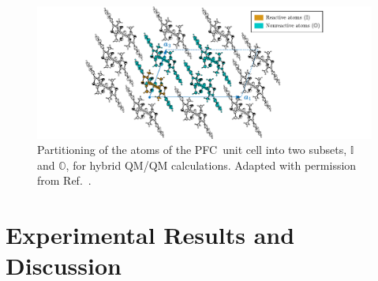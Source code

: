 \begin{figure}[ht!]
  \centering
  \includegraphics[width = \textwidth]{Figures/fig_DAE_PFC_QMQMmodel.pdf}
  \caption[Partitioning of PFC unit for QM/QM~calculations.]{
    Partitioning of the atoms of the PFC~unit cell into two subsets, $\mathbb{I}$ and $\mathbb{O}$,
    for hybrid QM/QM calculations.
    Adapted with permission from Ref.~\cite{Irie2001, Jean-Ruel2013}.
  }
  \label{fig: DAE-PFC-QMQMmodel}
\end{figure}


\section{Experimental Results and Discussion}
\label{sec: UED-DAE-results}

